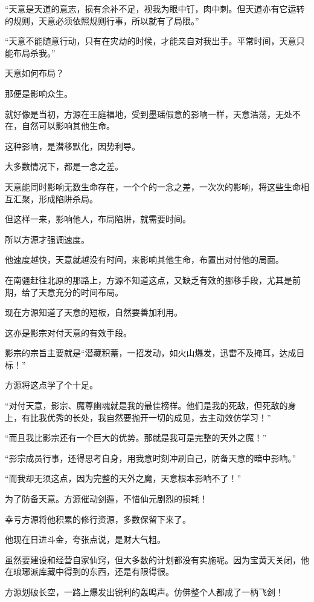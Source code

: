 \begin{this_body}
“天意是天道的意志，损有余补不足，视我为眼中钉，肉中刺。但天道亦有它运转的规则，天意必须依照规则行事，所以就有了局限。”

“天意不能随意行动，只有在灾劫的时候，才能亲自对我出手。平常时间，天意只能布局杀我。”

天意如何布局？

那便是影响众生。

就好像是当初，方源在王庭福地，受到墨瑶假意的影响一样，天意浩荡，无处不在，自然可以影响其他生命。

这种影响，是潜移默化，因势利导。

大多数情况下，都是一念之差。

天意能同时影响无数生命存在，一个个的一念之差，一次次的影响，将这些生命相互汇聚，形成陷阱杀局。

但这样一来，影响他人，布局陷阱，就需要时间。

所以方源才强调速度。

他速度越快，天意就越没有时间，来影响其他生命，布置出对付他的局面。

在南疆赶往北原的那路上，方源不知道这点，又缺乏有效的挪移手段，尤其是前期，给了天意充分的时间布局。

现在方源知道了天意的短板，自然要善加利用。

这亦是影宗对付天意的有效手段。

影宗的宗旨主要就是“潜藏积蓄，一招发动，如火山爆发，迅雷不及掩耳，达成目标！”

方源将这点学了个十足。

“对付天意，影宗、魔尊幽魂就是我的最佳榜样。他们是我的死敌，但死敌的身上，有比我优秀的长处，我自然要抛开一切的成见，去主动效仿学习！”

“而且我比影宗还有一个巨大的优势。那就是我可是完整的天外之魔！”

“影宗成员行事，还得思考自身，用我意时刻冲刷自己，防备天意的暗中影响。”

“而我却无须这点，因为完整的天外之魔，天意根本影响不了！”

为了防备天意。方源催动剑遁，不惜仙元剧烈的损耗！

幸亏方源将他积累的修行资源，多数保留下来了。

他现在日进斗金，夸张点说，是财大气粗。

虽然要建设和经营自家仙窍，但大多数的计划都没有实施呢。因为宝黄天关闭，他在琅琊派库藏中得到的东西，还是有限得很。

方源划破长空，一路上爆发出锐利的轰鸣声。仿佛整个人都成了一柄飞剑！


\end{this_body}
